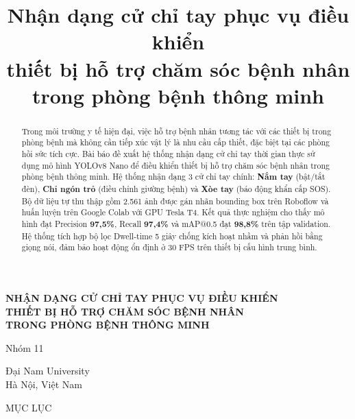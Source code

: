 \documentclass[conference]{IEEEtran}
\begin{document}
\begin{titlepage}
\begin{center}

\vspace*{3cm}

{\Large\bfseries NHẬN DẠNG CỬ CHỈ TAY PHỤC VỤ ĐIỀU KHIỂN\\[0.3cm]
THIẾT BỊ HỖ TRỢ CHĂM SÓC BỆNH NHÂN\\[0.3cm]
TRONG PHÒNG BỆNH THÔNG MINH}

\vspace{1.5cm}

{\large Nhóm 11}

\vspace{0.5cm}

{\large Đại Nam University\\
Hà Nội, Việt Nam}

\vspace{1cm}

{\large MỤC LỤC}

\end{center}
\end{titlepage}


\title{Nhận dạng cử chỉ tay phục vụ điều khiển\\thiết bị hỗ trợ chăm sóc bệnh nhân\\trong phòng bệnh thông minh}

\author{
}

\maketitle

\begin{abstract}
Trong môi trường y tế hiện đại, việc hỗ trợ bệnh nhân tương tác với các thiết bị trong phòng bệnh mà không cần tiếp xúc vật lý là nhu cầu cấp thiết, đặc biệt tại các phòng hồi sức tích cực. Bài báo đề xuất hệ thống nhận dạng cử chỉ tay thời gian thực sử dụng mô hình YOLOv8 Nano để điều khiển thiết bị hỗ trợ chăm sóc bệnh nhân trong phòng bệnh thông minh. Hệ thống nhận dạng 3 cử chỉ tay chính: \textbf{Nắm tay} (bật/tắt đèn), \textbf{Chỉ ngón trỏ} (điều chỉnh giường bệnh) và \textbf{Xòe tay} (báo động khẩn cấp SOS). Bộ dữ liệu tự thu thập gồm 2.561 ảnh được gán nhãn bounding box trên Roboflow và huấn luyện trên Google Colab với GPU Tesla T4. Kết quả thực nghiệm cho thấy mô hình đạt Precision \textbf{97,5\%}, Recall \textbf{97,4\%} và mAP@0.5 đạt \textbf{98,8\%} trên tập validation. Hệ thống tích hợp bộ lọc Dwell-time 5 giây chống kích hoạt nhầm và phản hồi bằng giọng nói, đảm bảo hoạt động ổn định ở 30 FPS trên thiết bị cấu hình trung bình.
\end{abstract}
\end{document}
